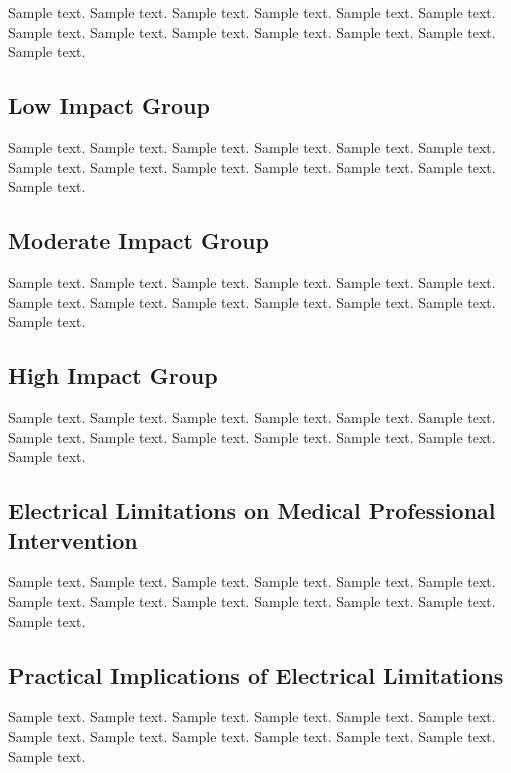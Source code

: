\documentclass[preprint,12pt,3p]{elsarticle}
\begin{document}
Sample text. Sample text. Sample text. Sample text. Sample text. Sample text. 
Sample text. Sample text. Sample text. Sample text. Sample text. Sample text. 
Sample text.

\subsection{Low Impact Group}
\label{subsec2}

Sample text. Sample text. Sample text. Sample text. Sample text. Sample text. 
Sample text. Sample text. Sample text. Sample text. Sample text. Sample text. 
Sample text.

\subsection{Moderate Impact Group}
\label{subsec2}

Sample text. Sample text. Sample text. Sample text. Sample text. Sample text. 
Sample text. Sample text. Sample text. Sample text. Sample text. Sample text. 
Sample text.

\subsection{High Impact Group}
\label{subsec2}

Sample text. Sample text. Sample text. Sample text. Sample text. Sample text. 
Sample text. Sample text. Sample text. Sample text. Sample text. Sample text. 
Sample text.

\subsection{Electrical Limitations on Medical Professional Intervention}
\label{subsec2}

Sample text. Sample text. Sample text. Sample text. Sample text. Sample text. 
Sample text. Sample text. Sample text. Sample text. Sample text. Sample text. 
Sample text.

\subsection{Practical Implications of Electrical Limitations}
\label{subsec2}

Sample text. Sample text. Sample text. Sample text. Sample text. Sample text. 
Sample text. Sample text. Sample text. Sample text. Sample text. Sample text. 
Sample text.

\appendix
\end{document}
